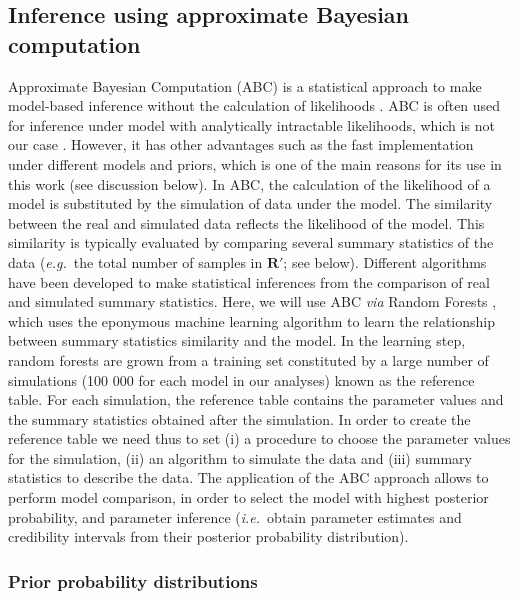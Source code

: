 \documentclass[a4paper]{article}
\begin{document}
\subsection*{Inference using approximate Bayesian computation}



Approximate Bayesian Computation (ABC) is a statistical approach to make model-based inference without the calculation of likelihoods \parencite[see][for a review]{Sunnaker2013}. ABC is often used for inference under model with analytically intractable likelihoods, which is not our case \parencite[e.g.][]{Crema2021b}. However, it has other advantages such as the fast implementation under different models and priors, which is one of the main reasons for its use in this work (see discussion below). In ABC, the calculation of the likelihood of a model is substituted by the simulation of data under the model. The similarity between the real and simulated data reflects the likelihood of the model. This similarity is typically evaluated by comparing several summary statistics of the data (\emph{e.g.}\ the total number of samples in $\bm{R'}$; see below).  Different algorithms have been developed to make statistical inferences from the comparison of real and simulated summary statistics. Here, we will use ABC \emph{via} Random Forests \parencite[ABCRF;][]{Pudlo2016, Raynal2019}, which uses the eponymous machine learning algorithm to learn the relationship between summary statistics similarity and the model. In the learning step, random forests are grown from a training set constituted by a large number of simulations (100 000 for each model in our analyses) known as the reference table. For each simulation, the reference table contains the parameter values and the summary statistics obtained after the simulation. In order to create the reference table we need thus to set (i) a procedure to choose the parameter values for the simulation, (ii) an algorithm to simulate the data and (iii) summary statistics to describe the data. The application of the ABC approach allows to perform model comparison, in order to select the model with highest posterior probability, and parameter inference (\emph{i.e.}\ obtain parameter estimates and credibility intervals from their posterior probability distribution).
\\

\subsubsection*{Prior probability distributions}
\end{document}
